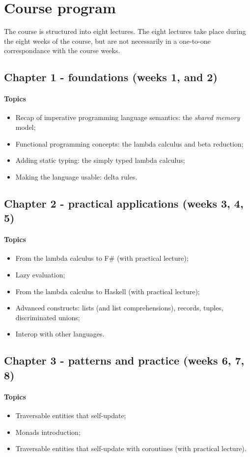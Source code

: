 \section{Course program}
The course is structured into eight lectures.
The eight lectures take place during the eight weeks of the course, but are not necessarily in a one-to-one correspondance with the course weeks.

\subsection{Chapter 1 - foundations (weeks 1, and 2)}
\paragraph*{Topics}
\begin{itemize}
	\item Recap of imperative programming language semantics: the \textit{shared memory} model;
	\item Functional programming concepts: the lambda calculus and beta reduction;
	\item Adding static typing: the simply typed lambda calculus;
	\item Making the language usable: delta rules.
\end{itemize}

\subsection{Chapter 2 - practical applications (weeks 3, 4, 5)}
\paragraph*{Topics}			
\begin{itemize}
	\item From the lambda calculus to F\# (with practical lecture);
	\item Lazy evaluation;
	\item From the lambda calculus to Haskell (with practical lecture);
	\item Advanced constructs: lists (and list comprehensions), records, tuples, discriminated unions;
	\item Interop with other languages.
\end{itemize}

\subsection{Chapter 3 - patterns and practice (weeks 6, 7, 8)}
\paragraph*{Topics}			
\begin{itemize}
	\item Traversable entities that self-update;
	\item Monads introduction;
	\item Traversable entities that self-update with coroutines (with practical lecture).
\end{itemize}
